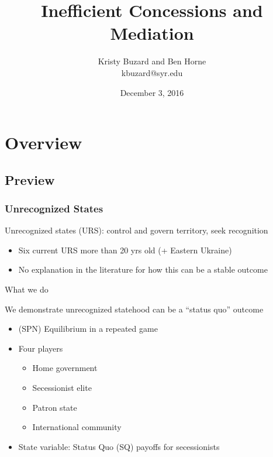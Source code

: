 \documentclass[handout]{beamer}
\begin{document}
\title[Inefficient Concessions and Mediation\hspace{2.95in}\insertframenumber/\inserttotalframenumber]{Inefficient Concessions and Mediation}
\author[Kristy Buzard and Ben Horne]{Kristy Buzard and Ben Horne\\ kbuzard@syr.edu}
\date{December 3, 2016}
\maketitle



\section{Overview}
\subsection{Preview}
\begin{frame}
\frametitle{Unrecognized States}
Unrecognized states (URS): control and govern territory, seek recognition
\pause
\begin{itemize}[<+->]
  \item Six current URS more than 20 yrs old (+ Eastern Ukraine)
	\item No explanation in the literature for how this can be a stable outcome
\end{itemize}
\end{frame}


\begin{frame}{What we do}

\pause
We demonstrate unrecognized statehood can be a ``status quo'' outcome
\pause
\begin{itemize}[<+->]
	\item (SPN) Equilibrium in a repeated game
	\item Four players
		\begin{itemize}[<+->]
			\item Home government
			\item Secessionist elite
			\item Patron state
			\item International community
		\end{itemize}
	\item State variable: Status Quo (SQ) payoffs for secessionists
\end{itemize}

\end{frame}
\end{document}

